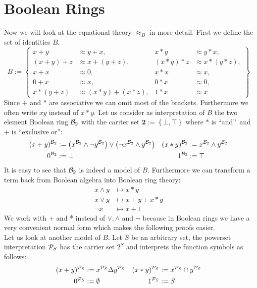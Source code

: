 \section{Boolean Rings}
Now we will look at the equational theory $\approx_B$ in more detail. First we define the set of identities $B$.
\[B:=\left\lbrace 
	\begin{aligned}
		x+y     & \approx y+x,         & x*y     & \approx y*x,     \\
		(x+y)+z & \approx x+(y+z),     & (x*y)*z & \approx x*(y*z), \\
		x+x     & \approx 0,           & x*x     & \approx x,       \\
		0+x     & \approx x,           & 0*x     & \approx 0,       \\
		x*(y+z) & \approx (x*y)+(x*z), & 1*x     & \approx x        
	\end{aligned}
	\right\rbrace \]
	Since $+$ and $*$ are associative we can omit most of the brackets. Furthermore we often write $xy$ instead of $x*y$.
	Let us consider as interpretation of $B$ the two element Boolean ring ${\mathcal{B}_2}$ with the carrier set $\textbf{2}:=\left\lbrace\bot,\top\right\rbrace$ where $*$ is \textquotedblleft and\textquotedblright\ and $+$ is \textquotedblleft exclusive or\textquotedblright:
	\begin{align*}
		(x+y)^{\mathcal{B}_2} & :=\left( x^{\mathcal{B}_2}\wedge\neg y^{\mathcal{B}_2}\right)  \vee \left( \neg x^{\mathcal{B}_2}\wedge y^{\mathcal{B}_2}\right) & (x*y)^{\mathcal{B}_2} & :=x^{\mathcal{B}_2}\wedge y^{\mathcal{B}_2} \\
		0^{\mathcal{B}_2}     & :=\bot                                                                                   & 1^{\mathcal{B}_2}     & :=\top                  
	\end{align*}
	It is easy to see that ${\mathcal{B}_2}$ is indeed a model of $B$. Furthermore we can transform a term back from Boolean algebra into Boolean ring theory:
	\begin{align*}
		x \wedge y & \mapsto x*y     \\
		x\vee y    & \mapsto x+y+x*y \\
		\neg x     & \mapsto x+1     
	\end{align*}
	We work with + and * instead of $\vee,\wedge$ and $\neg$ because in Boolean rings we have a very convenient normal form which makes the following proofs easier.\\
	Let us look at another model of $B$. Let $S$ be an arbitrary set, the powerset interpretation ${\mathcal{P}_S}$ has the carrier set $2^S$ and interprets the function symbols as follows:
	\begin{align*}
		(x+y)^{\mathcal{P}_S} & :=x^{\mathcal{P}_S}\Delta y^{\mathcal{P}_S} & (x*y)^{\mathcal{P}_S} & :=x^{\mathcal{P}_S}\cap y^{\mathcal{P}_S} \\
		0^{\mathcal{P}_S}     & :=\emptyset             & 1^{\mathcal{P}_S}     & :=S                   
	\end{align*}
